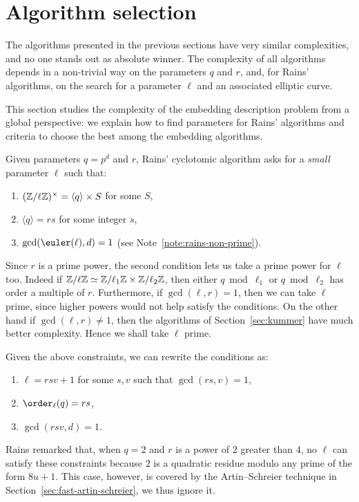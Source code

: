 \section{Algorithm selection}
\label{sec:selection}

The algorithms presented in the previous sections have very similar
complexities, and no one stands out as absolute winner. %
The complexity of all algorithms depends in a non-trivial way on the
parameters $q$ and $r$, and, for Rains' algorithms, on the search for
a parameter $\ell$ and an associated elliptic curve.

This section studies the complexity of the embedding description
problem from a global perspective: we explain how to find parameters
for Rains' algorithms and criteria to choose the best among the
embedding algorithms.

Given parameters $q=p^d$ and $r$, Rains' cyclotomic algorithm asks for
a \emph{small} parameter $\ell$ such that:
\begin{enumerate}
\item $(\mathbb{Z}/\ell\mathbb{Z})^\times = \langle q\rangle \times S$ for some $S$,
\item $\langle q \rangle = rs$ for some integer $s$,
\item $\gcd(\euler(\ell),d)=1$ (see Note~\ref{note:rains-non-prime}).
\end{enumerate}

Since $r$ is a prime power, the second condition lets us take a prime
power for $\ell$ too. Indeed if
$\mathbb{Z}/\ell\mathbb{Z}\simeq\mathbb{Z}/\ell_1\mathbb{Z}\times\mathbb{Z}/\ell_2\mathbb{Z}$, then either
$q\bmod\ell_1$ or $q\bmod\ell_2$ has order a multiple of $r$.
Furthermore, if $\gcd(\ell,r)=1$, then we can take $\ell$ prime, since
higher powers would not help satisfy the conditions. On the other hand
if $\gcd(\ell,r)\ne1$, then the algorithms of Section~\ref{sec:kummer} have much
better complexity. Hence we shall take $\ell$ prime.

Given the above constraints, we can rewrite the conditions as:
\begin{enumerate}
\item $\ell = rsv + 1$ for some $s,v$ such that $\gcd(rs,v)=1$,
\item $\order_\ell(q) = rs$,
\item $\gcd(rsv,d)=1$.
\end{enumerate}

\begin{remark}
  Rains remarked that, when $q=2$ and $r$ is a power of $2$ greater
  than $4$, no $\ell$ can satisfy these constraints because $2$ is a
  quadratic residue modulo any prime of the form $8u+1$. This case,
  however, is covered by the Artin--Schreier technique in
  Section~\ref{sec:fast-artin-schreier}, we thus ignore it.
\end{remark}


